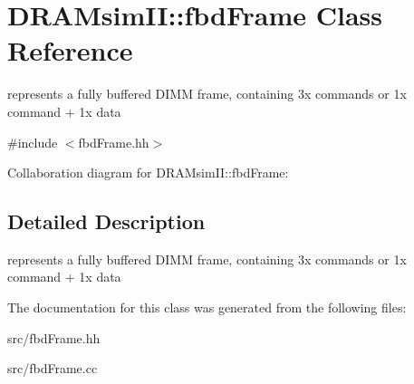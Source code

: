 \section{DRAMsimII::fbdFrame Class Reference}
\label{class_d_r_a_msim_i_i_1_1fbd_frame}


represents a fully buffered DIMM frame, containing 3x commands or 1x command + 1x data  




{\ttfamily \#include $<$fbdFrame.hh$>$}



Collaboration diagram for DRAMsimII::fbdFrame:

\subsection{Detailed Description}
represents a fully buffered DIMM frame, containing 3x commands or 1x command + 1x data 

The documentation for this class was generated from the following files:\begin{DoxyCompactItemize}
\item 
src/fbdFrame.hh\item 
src/fbdFrame.cc\end{DoxyCompactItemize}
